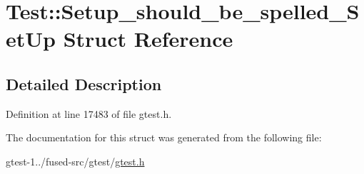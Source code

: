 \hypertarget{structtesting_1_1Test_1_1Setup__should__be__spelled__SetUp}{\section{\-Test\-:\-:\-Setup\-\_\-should\-\_\-be\-\_\-spelled\-\_\-\-Set\-Up \-Struct \-Reference}
\label{d7/dfb/structtesting_1_1Test_1_1Setup__should__be__spelled__SetUp}
}


\subsection{\-Detailed \-Description}


\-Definition at line 17483 of file gtest.\-h.



\-The documentation for this struct was generated from the following file\-:\begin{DoxyCompactItemize}
\item 
gtest-\/1../fused-\/src/gtest/\hyperlink{fused-src_2gtest_2gtest_8h}{gtest.\-h}\end{DoxyCompactItemize}
